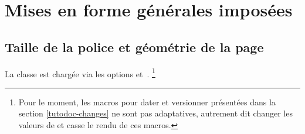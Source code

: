 \documentclass{main}
\begin{document}
\section{Mises en forme générales imposées}

\subsection{Taille de la police et géométrie de la page}

La classe  est chargée via les options  et \,.%
\footnote{
	Pour le moment, les macros pour dater et versionner présentées dans la section  \ref{tutodoc-changes} ne sont pas adaptatives, autrement dit changer les valeurs de  et  casse le rendu de ces macros.
}
\end{document}

